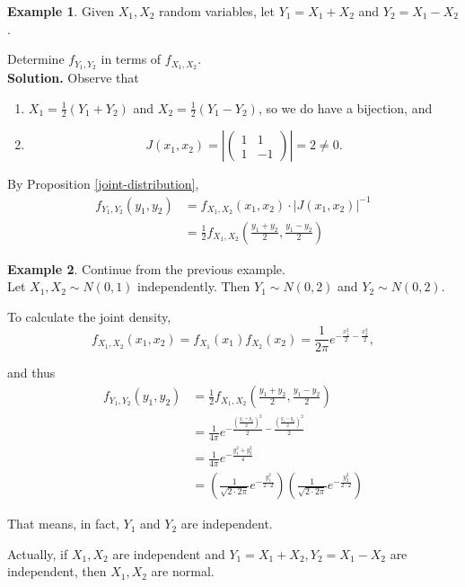 \documentclass[a4paper,11pt]{amsbook}
\theoremstyle{definition}
\newtheorem{example}{\hspace{-2em} \color{darkblue} Example}[chapter]
\theoremstyle{remark}
\newcommand{\abs}[1]{\left|#1\right|}
\newcommand\0{\varnothing}
\begin{document}
    \begin{example}
        Given $X_1,X_2$ random variables, let $Y_1=X_1+X_2$ and $Y_2=X_1-X_2$.

        Determine $f_{Y_1,Y_2}$ in terms of $f_{X_1,X_2}$.\\
        \textbf{Solution.} Observe that \begin{enumerate}
            \item $X_1=\frac12(Y_1+Y_2)$ and $X_2=\frac12(Y_1-Y_2)$, so we do have a bijection, and
            \item $$J(x_1,x_2)=\abs{\begin{pmatrix}
                1 & 1 \\
                1 & -1
            \end{pmatrix}}=2\neq0.$$
        \end{enumerate}

        By Proposition \ref{joint-distribution}, \begin{align*}
            f_{Y_1,Y_2}(y_1,y_2)&=f_{X_1,X_2}(x_1,x_2)\cdot\abs{J(x_1,x_2)}^{-1} \\
            &=\frac12f_{X_1,X_2}\left(\frac{y_1+y_2}{2},\frac{y_1-y_2}{2}\right)
        \end{align*}
    \end{example}

    \begin{example}
        Continue from the previous example.\\
        Let $X_1,X_2\sim N(0,1)$ independently. Then $Y_1\sim N(0,2)$ and $Y_2\sim N(0,2)$.

        To calculate the joint density, $$f_{X_1,X_2}(x_1,x_2)=f_{X_1}(x_1)f_{X_2}(x_2)=\frac{1}{2\pi}e^{-\frac{x_1^2}{2}-\frac{x_2^2}{2}},$$

        and thus \begin{align*}
            f_{Y_1,Y_2}(y_1,y_2)&=\frac12f_{X_1,X_2}\left(\frac{y_1+y_2}{2},\frac{y_1-y_2}{2}\right) \\
            &=\frac{1}{4\pi}e^{-\frac{\left(\frac{y_1+y_2}{2}\right)^2}{2}-\frac{\left(\frac{y_1-y_2}{2}\right)^2}{2}} \\
            &=\frac{1}{4\pi}e^{-\frac{y_1^2+y_2^2}{4}} \\
            &=\left(\frac{1}{\sqrt{2\cdot2\pi}}e^{-\frac{y_1^2}{2\cdot2}}\right)\left(\frac{1}{\sqrt{2\cdot2\pi}}e^{-\frac{y_2^2}{2\cdot2}}\right)
        \end{align*}

        That means, in fact, $Y_1$ and $Y_2$ are independent.
        
        Actually, if $X_1,X_2$ are independent and $Y_1=X_1+X_2,Y_2=X_1-X_2$ are independent, then $X_1,X_2$ are normal.
    \end{example}
\end{document}
